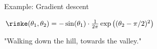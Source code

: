 \begin{vbframe}{Example: Gradient descent}
\begin{center}
 $\riske(\theta_1, \theta_2) = -\sin(\theta_1) \cdot \frac{1}{2\pi} \exp\left( (\theta_2 - \pi / 2)^2 \right)$
\begin{figure}
\centering
{}
\end{figure}
\vspace{0.5 cm}
"Walking down the hill, towards the valley."
\end{center}
\end{vbframe}

